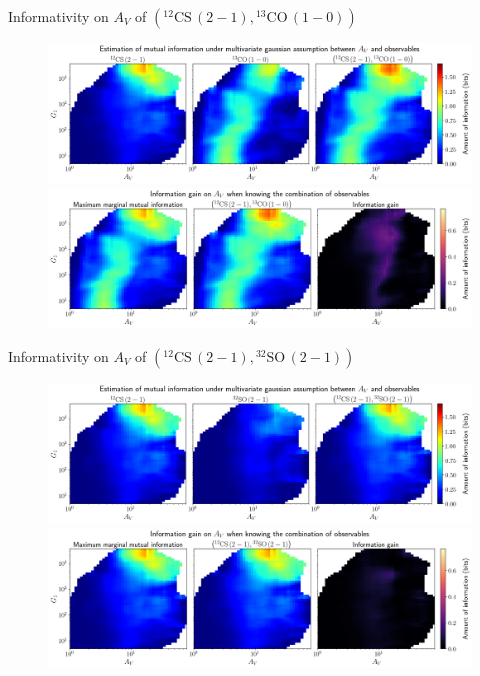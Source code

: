 \documentclass{beamer}
\begin{document}
\begin{frame}{Informativity on $A_V$ of $\left(\mathrm{^{12}CS\,(2-1)},\mathrm{^{13}CO\,(1-0)}\right)$}
    \begin{figure}
        \centering
        \includegraphics[width=0.95\linewidth]{../linearinfo/av__12cs21_13co10_linearinfo.png}
        \vfill
        \includegraphics[width=0.95\linewidth]{../linearinfo/av__12cs21_13co10_linearinfo_gain.png}
    \end{figure}
\end{frame}

\begin{frame}{Informativity on $A_V$ of $\left(\mathrm{^{12}CS\,(2-1)},\mathrm{^{32}SO\,(2-1)}\right)$}
    \begin{figure}
        \centering
        \includegraphics[width=0.95\linewidth]{../linearinfo/av__12cs21_32so21_linearinfo.png}
        \vfill
        \includegraphics[width=0.95\linewidth]{../linearinfo/av__12cs21_32so21_linearinfo_gain.png}
    \end{figure}
\end{frame}
\end{document}
